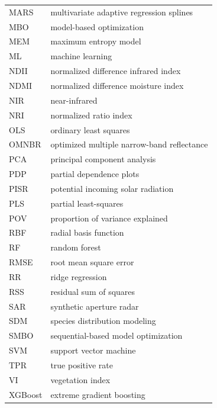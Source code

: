 \documentclass[remotesensing,article,submit,moreauthors,pdftex]{Definitions/mdpi}
\begin{document}
{\begin{tabular}{@{}ll}
		MARS    & multivariate adaptive regression splines                \\
		MBO     & model-based optimization                                \\
		MEM     & maximum entropy model                                   \\
		ML      & machine learning                                        \\
		NDII    & normalized difference infrared index                    \\
		NDMI    & normalized difference moisture index                    \\
		NIR     & near-infrared                                           \\
		NRI     & normalized ratio index                                  \\
		OLS     & ordinary least squares                                  \\
		OMNBR   & optimized multiple narrow-band reflectance              \\
		PCA     & principal component analysis                            \\
		PDP     & partial dependence plots                                \\
		PISR    & potential incoming solar radiation                      \\
		PLS     & partial least-squares                                   \\
		POV     & proportion of variance explained                        \\
		RBF     & radial basis function                                   \\
		RF      & random forest                                           \\
		RMSE    & root mean square error                                  \\
		RR      & ridge regression                                        \\
		RSS     & residual sum of squares                                 \\
		SAR     & synthetic aperture radar                                \\
		SDM     & species distribution modeling                           \\
		SMBO    & sequential-based model optimization                     \\
		SVM     & support vector machine                                  \\
		TPR     & true positive rate                                      \\
		VI      & vegetation index                                        \\
		XGBoost & extreme gradient boosting
	\end{tabular}}
\end{document}
